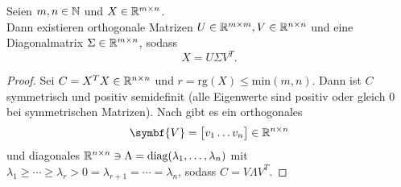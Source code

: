 \begin{theorem}[Singulärwertzerlegung]\label{th:svd}
    Seien \(m,n\in\mathbb{N}\) und \(X \in \mathbb{R}^{m \times n}\). \\
    Dann existieren orthogonale Matrizen \(U \in \mathbb{R}^{m \times m}, V \in \mathbb{R}^{n \times n}\) und eine Diagonalmatrix \(\Sigma \in \mathbb{R}^{m \times n}\), sodass
    \begin{equation*}
        X = U \Sigma V^{T}.
    \end{equation*}
\end{theorem}
\begin{proof}
    Sei \(C = X^{T}X \in \mathbb{R}^{n \times n}\) und \(r = \text{rg}(X) \leq \text{min}(m,n)\).
    Dann ist \(C\) symmetrisch und positiv semidefinit (alle Eigenwerte sind positiv oder gleich \num{0} bei symmetrischen Matrizen). 
    Nach  gibt es ein orthogonales 
    \begin{equation*}
        \symbf{V} =
        \big[
        \begin{matrix}
            v_1 \dots v_n
        \end{matrix}
        \big]
        \in \R^{n \times n}
    \end{equation*}
    und diagonales \(\mathbb{R}^{n \times n} \ni \Lambda = \text{diag}(\lambda_1,\ldots,\lambda_n)\) mit \(\lambda_1 \geq \cdots \geq \lambda_r > 0 = \lambda_{r+1} = \cdots = \lambda_n\), sodass \(C = V \Lambda V^{T}\).    


\end{proof}
